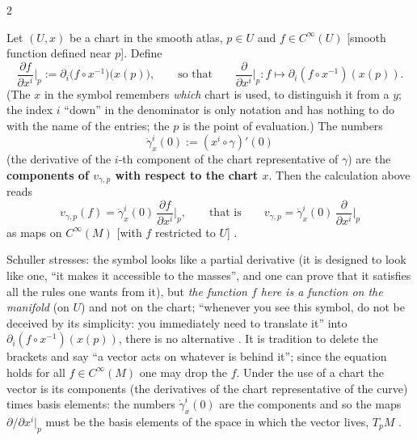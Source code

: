 \begin{paracol}{2}
\begin{definition}\label{def:c05-chartbasis}
Let $(U,x)$ be a chart in the smooth atlas, $p\in U$ and $f\in C^\infty(U)$ [smooth function defined near $p$]. Define
\[
  \frac{\partial f}{\partial x^i}\Big|_p:=\partial_i\bigl(f\circ x^{-1}\bigr)\bigl(x(p)\bigr),\qquad\text{so that}\qquad\frac{\partial}{\partial x^i}\Big|_p\colon f\longmapsto\partial_i(f\circ x^{-1})(x(p)).
\]
(The $x$ in the symbol remembers \emph{which} chart is used, to distinguish it from a $y$; the index $i$ ``down'' in the denominator is only notation and has nothing to do with the name of the entries; the $p$ is the point of evaluation.)
The numbers
\[
  \dot\gamma^i_x(0):=(x^i\circ\gamma)'(0)
\]
(the derivative of the $i$-th component of the chart representative of $\gamma$) are the \textbf{components of $v_{\gamma,p}$ with respect to the chart $x$}. Then the calculation above reads
\[
  v_{\gamma,p}(f)=\dot\gamma^i_x(0)\,\frac{\partial f}{\partial x^i}\Big|_p,\qquad\text{that is}\qquad v_{\gamma,p}=\dot\gamma^i_x(0)\,\frac{\partial}{\partial x^i}\Big|_p
\]
as maps on $C^\infty(M)$ [with $f$ restricted to $U$]
.
\end{definition}
Schuller stresses: the symbol looks like a partial derivative (it is designed to look like one, ``it makes it accessible to the masses'', and one can prove that it satisfies all the rules one wants from it), but \emph{the function $f$ here is a function on the manifold} (on $U$) and not on the chart; ``whenever you see this symbol, do not be deceived by its simplicity: you immediately need to translate it'' into $\partial_i(f\circ x^{-1})(x(p))$,
there is no alternative . It is tradition to delete the brackets and say ``a vector acts on whatever is behind it''; since the equation holds for all $f\in C^\infty(M)$ one may drop the $f$. Under the use of a chart the vector is its components (the derivatives of the chart representative of the curve) times basis elements:
the numbers $\dot\gamma^i_x(0)$ are the components and so the maps $\partial/\partial x^i|_p$ must be the basis elements of the space in which the vector lives, $T_pM$ .


\end{paracol}
